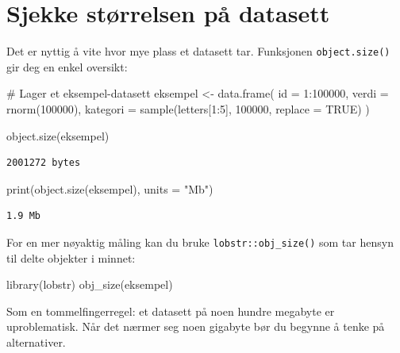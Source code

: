 \documentclass[
  norsk,
  letterpaper,
  DIV=11,
  numbers=noendperiod]{scrreprt}
\newenvironment{Shaded}{\begin{snugshade}}{\end{snugshade}}
\newcommand{\AttributeTok}[1]{\textcolor[rgb]{0.40,0.45,0.13}{#1}}
\newcommand{\CommentTok}[1]{\textcolor[rgb]{0.37,0.37,0.37}{#1}}
\newcommand{\ConstantTok}[1]{\textcolor[rgb]{0.56,0.35,0.01}{#1}}
\newcommand{\DecValTok}[1]{\textcolor[rgb]{0.68,0.00,0.00}{#1}}
\newcommand{\FunctionTok}[1]{\textcolor[rgb]{0.28,0.35,0.67}{#1}}
\newcommand{\NormalTok}[1]{\textcolor[rgb]{0.00,0.23,0.31}{#1}}
\newcommand{\OtherTok}[1]{\textcolor[rgb]{0.00,0.23,0.31}{#1}}
\newcommand{\SpecialCharTok}[1]{\textcolor[rgb]{0.37,0.37,0.37}{#1}}
\newcommand{\StringTok}[1]{\textcolor[rgb]{0.13,0.47,0.30}{#1}}
\theoremstyle{definition}
\theoremstyle{remark}
\begin{document}
\section{Sjekke størrelsen på
datasett}\label{sjekke-stuxf8rrelsen-puxe5-datasett}

Det er nyttig å vite hvor mye plass et datasett tar. Funksjonen
\texttt{object.size()} gir deg en enkel oversikt:

\begin{Shaded}
\begin{Highlighting}[]
\CommentTok{\# Lager et eksempel{-}datasett}
\NormalTok{eksempel }\OtherTok{\textless{}{-}} \FunctionTok{data.frame}\NormalTok{(}
  \AttributeTok{id =} \DecValTok{1}\SpecialCharTok{:}\DecValTok{100000}\NormalTok{,}
  \AttributeTok{verdi =} \FunctionTok{rnorm}\NormalTok{(}\DecValTok{100000}\NormalTok{),}
  \AttributeTok{kategori =} \FunctionTok{sample}\NormalTok{(letters[}\DecValTok{1}\SpecialCharTok{:}\DecValTok{5}\NormalTok{], }\DecValTok{100000}\NormalTok{, }\AttributeTok{replace =} \ConstantTok{TRUE}\NormalTok{)}
\NormalTok{)}

\FunctionTok{object.size}\NormalTok{(eksempel)}
\end{Highlighting}
\end{Shaded}

\begin{verbatim}
2001272 bytes
\end{verbatim}

\begin{Shaded}
\begin{Highlighting}[]
\FunctionTok{print}\NormalTok{(}\FunctionTok{object.size}\NormalTok{(eksempel), }\AttributeTok{units =} \StringTok{"Mb"}\NormalTok{)}
\end{Highlighting}
\end{Shaded}

\begin{verbatim}
1.9 Mb
\end{verbatim}

For en mer nøyaktig måling kan du bruke \texttt{lobstr::obj\_size()} som
tar hensyn til delte objekter i minnet:

\begin{Shaded}
\begin{Highlighting}[]
\FunctionTok{library}\NormalTok{(lobstr)}
\FunctionTok{obj\_size}\NormalTok{(eksempel)}
\end{Highlighting}
\end{Shaded}

Som en tommelfingerregel: et datasett på noen hundre megabyte er
uproblematisk. Når det nærmer seg noen gigabyte bør du begynne å tenke
på alternativer.
\end{document}
